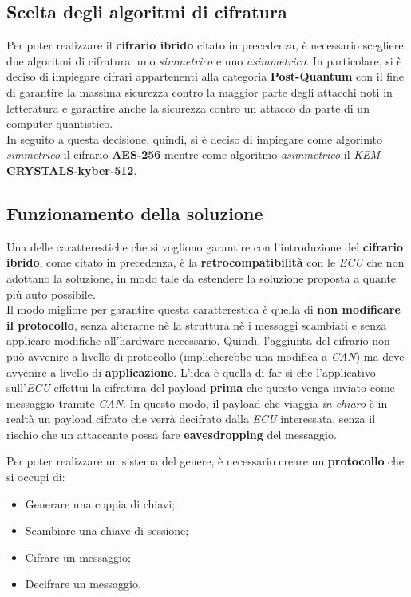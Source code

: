 \subsection{Scelta degli algoritmi di cifratura}
Per poter realizzare il \textbf{cifrario ibrido} citato in precedenza, è necessario scegliere due algoritmi di cifratura: uno \emph{simmetrico} e uno \emph{asimmetrico}. In particolare, si è deciso di impiegare cifrari appartenenti alla categoria \textbf{Post-Quantum} con il fine di garantire la massima sicurezza contro la maggior parte degli attacchi noti in letteratura e garantire anche la sicurezza contro un attacco da parte di un computer quantistico.\\
In seguito a questa decisione, quindi, si è deciso di impiegare come algorimto \emph{simmetrico} il cifrario \textbf{AES-256} mentre come algoritmo \emph{asimmetrico} il \emph{KEM} \textbf{CRYSTALS-kyber-512}.

\subsection{Funzionamento della soluzione}
Una delle caratterestiche che si vogliono garantire con l'introduzione del \textbf{cifrario ibrido}, come citato in precedenza, è la \textbf{retrocompatibilità} con le \emph{ECU} che non adottano la soluzione, in modo tale da estendere la soluzione proposta a quante più auto possibile.\\
Il modo migliore per garantire questa caratterestica è quella di \textbf{non modificare il protocollo}, senza alterarne nè la struttura nè i messaggi scambiati e senza applicare modifiche all'hardware necessario. Quindi, l'aggiunta del cifrario non può avvenire a livello di protocollo (implicherebbe una modifica a \emph{CAN}) ma deve avvenire a livello di \textbf{applicazione}. L'idea è quella di far sì che l'applicativo sull'\emph{ECU} effettui la cifratura del payload \textbf{prima} che questo venga inviato come messaggio tramite \emph{CAN}. In questo modo, il payload che viaggia \emph{in chiaro} è in realtà un payload cifrato che verrà decifrato dalla \emph{ECU} interessata, senza il rischio che un attaccante possa fare \textbf{eavesdropping} del messaggio.

Per poter realizzare un sistema del genere, è necessario creare un \textbf{protocollo} che si occupi di:
\begin{itemize}
    \item Generare una coppia di chiavi;
    \item Scambiare una chiave di sessione;
    \item Cifrare un messaggio;
    \item Decifrare un messaggio.
\end{itemize}

